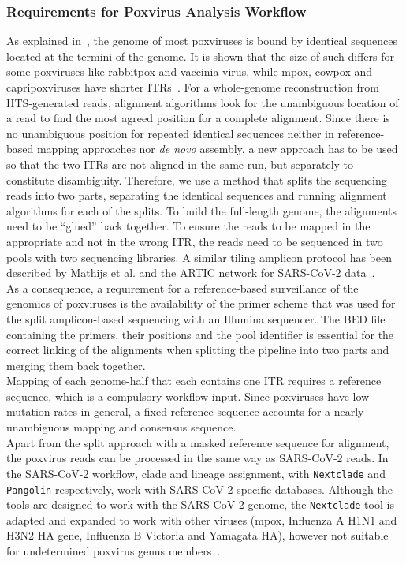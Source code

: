 \subsubsection{Requirements for Poxvirus Analysis Workflow}
As explained in~, the genome of most poxviruses is bound by identical sequences located at the termini of the genome. It is shown that the size of such differs for some poxviruses like rabbitpox and vaccinia virus, while mpox, cowpox and capripoxviruses have shorter \acp{ITR}~\cite{wittek1978inverted}. For a whole-genome reconstruction from \ac{HTS}-generated reads, alignment algorithms look for the unambiguous location of a read to find the most agreed position for a complete alignment. Since there is no unambiguous position for repeated identical sequences neither in reference-based mapping approaches nor \textit{de novo} assembly, a new approach has to be used so that the two \acp{ITR} are not aligned in the same run, but separately to constitute disambiguity. Therefore, we use a method that splits the sequencing reads into two parts, separating the identical sequences and running alignment algorithms for each of the splits. To build the full-length genome, the alignments need to be ``glued'' back together. To ensure the reads to be mapped in the appropriate and not in the wrong \ac{ITR}, the reads need to be sequenced in two pools with two sequencing libraries. A similar tiling amplicon protocol has been described by Mathijs et al. and the ARTIC network for \ac{SARS-CoV-2} data~\cite{tyson2020improvements, mathijs2022robust}. \\
As a consequence, a requirement for a reference-based surveillance of the genomics of poxviruses is the availability of the primer scheme that was used for the split amplicon-based sequencing with an Illumina sequencer. The \ac{BED} file containing the primers, their positions and the pool identifier is essential for the correct linking of the alignments when splitting the pipeline into two parts and merging them back together. \\
Mapping of each genome-half that each contains one \ac{ITR} requires a reference sequence, which is a compulsory workflow input. Since poxviruses have low mutation rates in general, a fixed reference sequence accounts for a nearly unambiguous mapping and consensus sequence. \\
Apart from the split approach with a masked reference sequence for alignment, the poxvirus reads can be processed in the same way as \ac{SARS-CoV-2} reads. In the \ac{SARS-CoV-2} workflow, clade and lineage assignment, with \texttt{Nextclade} and \texttt{Pangolin} respectively, work with \ac{SARS-CoV-2} specific databases. Although the tools are designed to work with the \ac{SARS-CoV-2} genome, the \texttt{Nextclade} tool is adapted and expanded to work with other viruses (mpox, Influenza A H1N1 and H3N2 HA gene, Influenza B Victoria and Yamagata HA), however not suitable for undetermined poxvirus genus members~\cite{aksamentov2021nextclade}.

